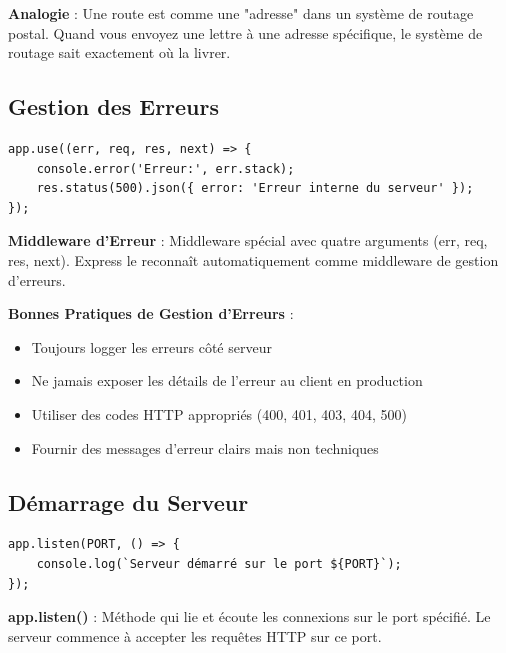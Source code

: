 \begin{analogybox}
    \textbf{Analogie} : Une route est comme une "adresse" dans un système de routage postal. Quand vous envoyez une lettre à une adresse spécifique, le système de routage sait exactement où la livrer.
\end{analogybox}

\subsection{Gestion des Erreurs}

\begin{lstlisting}[style=javascript]
app.use((err, req, res, next) => {
    console.error('Erreur:', err.stack);
    res.status(500).json({ error: 'Erreur interne du serveur' });
});
\end{lstlisting}

\begin{definitionbox}
    \textbf{Middleware d'Erreur} : Middleware spécial avec quatre arguments (err, req, res, next). Express le reconnaît automatiquement comme middleware de gestion d'erreurs.
\end{definitionbox}

\begin{bestpracticebox}
    \textbf{Bonnes Pratiques de Gestion d'Erreurs} :
    \begin{itemize}
        \item Toujours logger les erreurs côté serveur
        \item Ne jamais exposer les détails de l'erreur au client en production
        \item Utiliser des codes HTTP appropriés (400, 401, 403, 404, 500)
        \item Fournir des messages d'erreur clairs mais non techniques
    \end{itemize}
\end{bestpracticebox}

\subsection{Démarrage du Serveur}

\begin{lstlisting}[style=javascript]
app.listen(PORT, () => {
    console.log(`Serveur démarré sur le port ${PORT}`);
});
\end{lstlisting}

\begin{definitionbox}
    \textbf{app.listen()} : Méthode qui lie et écoute les connexions sur le port spécifié. Le serveur commence à accepter les requêtes HTTP sur ce port.
\end{definitionbox}

